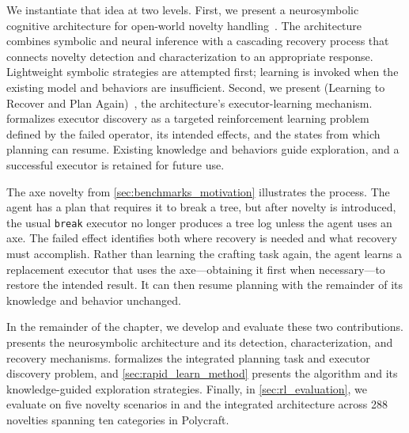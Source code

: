 {We instantiate that idea at two levels. First, we present a neurosymbolic cognitive architecture for open-world novelty handling~\citep{goel2024neurosymbolic}. The architecture combines symbolic and neural inference with a cascading recovery process that connects novelty detection and characterization to an appropriate response. Lightweight symbolic strategies are attempted first; learning is invoked when the existing model and behaviors are insufficient. Second, we present \emph{\RAPidLearn{}} (Learning to Recover and Plan Again)~\citep{goel2022rapidlearn}, the architecture's executor-learning mechanism. \RAPidLearn{} formalizes executor discovery as a targeted reinforcement learning problem defined by the failed operator, its intended effects, and the states from which planning can resume. Existing knowledge and behaviors guide exploration, and a successful executor is retained for future use.

The axe novelty from \cref{sec:benchmarks_motivation} illustrates the process. The agent has a plan that requires it to break a tree, but after novelty is introduced, the usual \texttt{break} executor no longer produces a tree log unless the agent uses an axe. The failed effect identifies both where recovery is needed and what recovery must accomplish. Rather than learning the crafting task again, the agent learns a replacement executor that uses the axe---obtaining it first when necessary---to restore the intended result. It can then resume planning with the remainder of its knowledge and behavior unchanged.

In the remainder of the chapter, we develop and evaluate these two contributions.  presents the neurosymbolic architecture and its detection, characterization, and recovery mechanisms.  formalizes the integrated planning task and executor discovery problem, and \cref{sec:rapid_learn_method} presents the \RAPidLearn{} algorithm and its knowledge-guided exploration strategies. Finally, in \cref{sec:rl_evaluation}, we evaluate \RAPidLearn{} on five novelty scenarios in \NovelGridworlds{} and the integrated architecture across 288 novelties spanning ten categories in Polycraft.}
